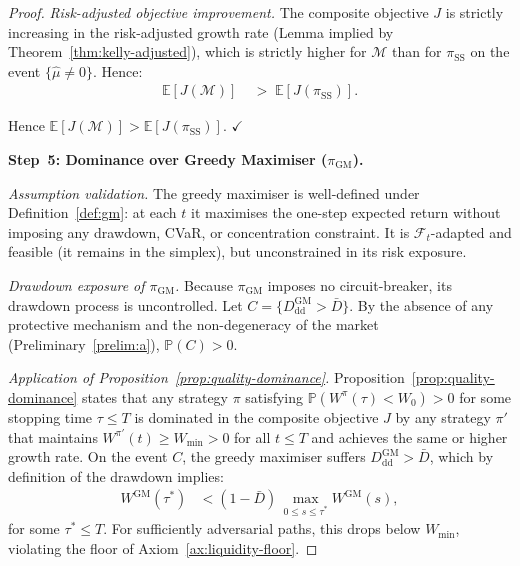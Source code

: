\documentclass[12pt,openany]{book}
\newcommand{\E}{\mathbb{E}}
\numberwithin{equation}{chapter}
\theoremstyle{plain}
\theoremstyle{definition}
\theoremstyle{remark}
\numberwithin{equation}{chapter}
\theoremstyle{plain}
\begin{document}
\begin{proof}
\medskip
\noindent\textit{Risk-adjusted objective improvement.}
The composite objective $J$ is strictly increasing in the
risk-adjusted growth rate (Lemma implied by
Theorem~\ref{thm:kelly-adjusted}), which is strictly higher for
$\mathcal{M}$ than for $\pi_{\mathrm{SS}}$ on the event
$\{\hat{\mu} \ne 0\}$.  Hence:
\begin{align}
  \E[J(\mathcal{M})]
  &\;>\; \E[J(\pi_{\mathrm{SS}})].
  \label{eq:step4-exp}
\end{align}

\medskip
Hence $\E[J(\mathcal{M})] > \E[J(\pi_{\mathrm{SS}})]$. \hfill$\checkmark$

\bigskip
\noindent\textbf{Step~5: Dominance over Greedy Maximiser
($\pi_{\mathrm{GM}}$).}

\medskip
\noindent\textit{Assumption validation.}
The greedy maximiser is well-defined under Definition~\ref{def:gm}:
at each $t$ it maximises the one-step expected return without
imposing any drawdown, CVaR, or concentration constraint.  It
is $\mathcal{F}_t$-adapted and feasible (it remains in the
simplex), but unconstrained in its risk exposure.

\medskip
\noindent\textit{Drawdown exposure of $\pi_{\mathrm{GM}}$.}
Because $\pi_{\mathrm{GM}}$ imposes no circuit-breaker, its drawdown
process is uncontrolled.  Let $C = \{D_{\mathrm{dd}}^{\mathrm{GM}}
> \bar{D}\}$.  By the absence of any protective mechanism and the
non-degeneracy of the market (Preliminary~\ref{prelim:a}),
$\mathbb{P}(C) > 0$.

\medskip
\noindent\textit{Application of Proposition~\ref{prop:quality-dominance}.}
Proposition~\ref{prop:quality-dominance} states that any strategy
$\pi$ satisfying $\mathbb{P}(W^{\pi}(\tau) < W_0) > 0$ for some
stopping time $\tau \le T$ is dominated in the composite objective
$J$ by any strategy $\pi'$ that maintains $W^{\pi'}(t) \ge W_{\min}
> 0$ for all $t \le T$ and achieves the same or higher growth rate.
On the event $C$, the greedy maximiser suffers
$D_{\mathrm{dd}}^{\mathrm{GM}} > \bar{D}$, which by definition
of the drawdown implies:
\begin{align}
  W^{\mathrm{GM}}(\tau^*)
  &< (1-\bar{D})\,\max_{0\le s\le\tau^*} W^{\mathrm{GM}}(s),
  \label{eq:step5-dd}
\end{align}
for some $\tau^* \le T$.  For sufficiently adversarial paths,
this drops below $W_{\min}$, violating the floor of
Axiom~\ref{ax:liquidity-floor}.


\end{proof}
\end{document}
